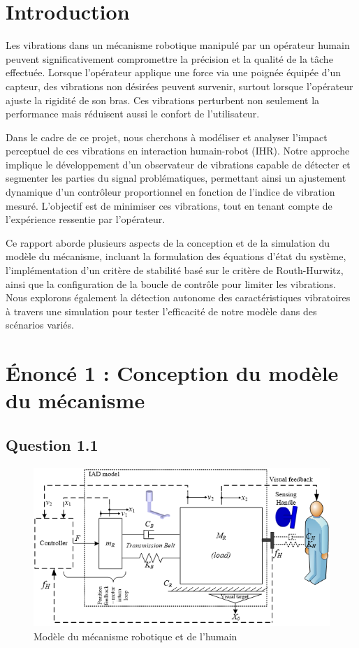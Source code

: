 \documentclass[a4paper,12pt]{article}
\begin{document}
\tableofcontents
\newpage

\section{Introduction}

    Les vibrations dans un mécanisme robotique manipulé par un opérateur humain peuvent significativement compromettre la précision et la qualité de la tâche effectuée. Lorsque l’opérateur applique une force via une poignée équipée d’un capteur, des vibrations non désirées peuvent survenir, surtout lorsque l'opérateur ajuste la rigidité de son bras. Ces vibrations perturbent non seulement la performance mais réduisent aussi le confort de l’utilisateur.

    Dans le cadre de ce projet, nous cherchons à modéliser et analyser l'impact perceptuel de ces vibrations en interaction humain-robot (IHR). Notre approche implique le développement d'un observateur de vibrations capable de détecter et segmenter les parties du signal problématiques, permettant ainsi un ajustement dynamique d’un contrôleur proportionnel en fonction de l'indice de vibration mesuré. L’objectif est de minimiser ces vibrations, tout en tenant compte de l’expérience ressentie par l’opérateur.

    Ce rapport aborde plusieurs aspects de la conception et de la simulation du modèle du mécanisme, incluant la formulation des équations d’état du système, l’implémentation d’un critère de stabilité basé sur le critère de Routh-Hurwitz, ainsi que la configuration de la boucle de contrôle pour limiter les vibrations. Nous explorons également la détection autonome des caractéristiques vibratoires à travers une simulation pour tester l'efficacité de notre modèle dans des scénarios variés.

\newpage
\section{Énoncé 1 : Conception du modèle du mécanisme}
\subsection{Question 1.1}
\begin{figure}[h!]
    \centering
    \includegraphics[width=14cm]{./img/modele_humain-meca_robotique.png}
    \caption{Modèle du mécanisme robotique et de l'humain \label{fig:ModelMecaRobotHumain}}
\end{figure}
\end{document}
